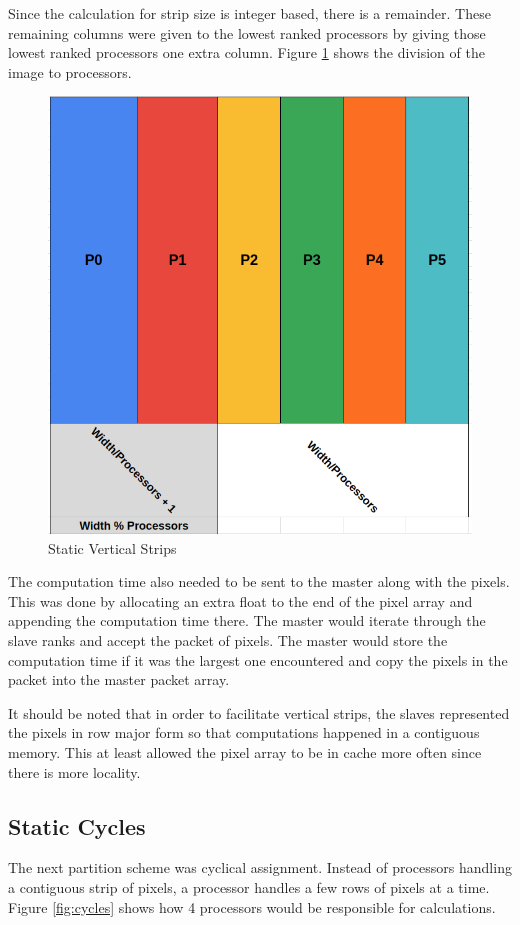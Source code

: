 \documentclass[11pt]{article}
\begin{document}
		Since the calculation for strip size is integer based, there is a remainder. These remaining columns were given to the lowest ranked processors by giving those lowest ranked processors one extra column. Figure \ref{fig:strips} shows the division of the image to processors.
		
		\begin{figure}[H]
			\centering
			\includegraphics[width=0.7\linewidth]{Pictures/Strips}
			\caption{Static Vertical Strips}
			\label{fig:strips}
		\end{figure}
	
		The computation time also needed to be sent to the master along with the pixels. This was done by allocating an extra float to the end of the pixel array and appending the computation time there. The master would iterate through the slave ranks and accept the packet of pixels. The master would store the computation time if it was the largest one encountered and copy the pixels in the packet into the master packet array. 
		
		It should be noted that in order to facilitate vertical strips, the slaves represented the pixels in row major form so that computations happened in a contiguous memory. This at least allowed the pixel array to be in cache more often since there is more locality. 
	
	\subsection{Static Cycles}
	
		The next partition scheme was cyclical assignment. Instead of processors handling a contiguous strip of pixels, a processor handles a few rows of pixels at a time. Figure \ref{fig:cycles} shows how 4 processors would be responsible for calculations. 
		
\end{document}

